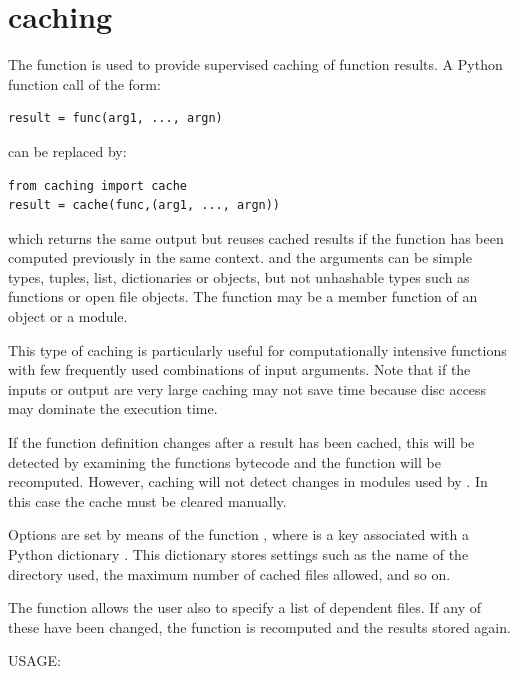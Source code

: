 \documentclass{manual}
\begin{document}
\section{caching}
\label{sec:caching}

The  function is used to provide supervised caching of function
results. A Python function call of the form:

\begin{verbatim}
result = func(arg1, ..., argn)
\end{verbatim}

can be replaced by:

\begin{verbatim}
from caching import cache
result = cache(func,(arg1, ..., argn))
\end{verbatim}

which returns the same output but reuses cached
results if the function has been computed previously in the same context.
 and the arguments can be simple types, tuples, list, dictionaries or
objects, but not unhashable types such as functions or open file objects.
The function  may be a member function of an object or a module.

This type of caching is particularly useful for computationally intensive
functions with few frequently used combinations of input arguments. Note that
if the inputs or output are very large caching may not save time because
disc access may dominate the execution time.

If the function definition changes after a result has been cached, this will be
detected by examining the functions bytecode and the function will be recomputed.
However, caching will not detect changes in modules used by .
In this case the cache must be cleared manually.

Options are set by means of the function ,
where  is a key associated with a
Python dictionary . This dictionary stores settings such as the name of
the directory used, the maximum number of cached files allowed, and so on.

The  function allows the user also to specify a list of dependent files. If any of these
have been changed, the function is recomputed and the results stored again.


USAGE: \nopagebreak
\end{document}
